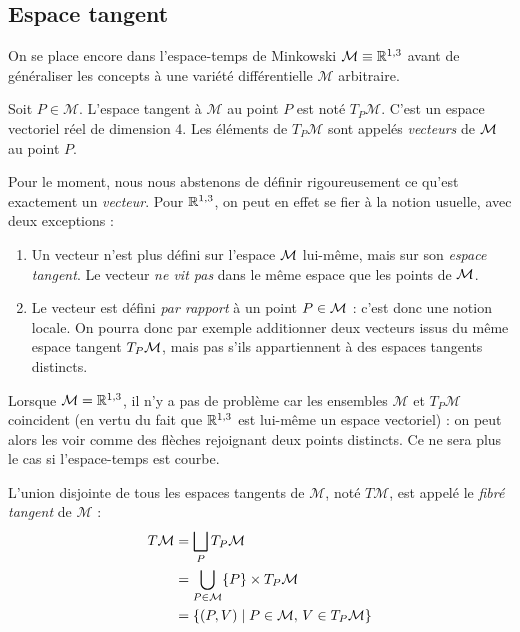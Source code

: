 {\subsection{Espace tangent}
On se place encore dans l'espace-temps de Minkowski $\mathcal{M} \equiv \mathbb{R}^{1,3}$ avant de généraliser les concepts à une variété différentielle $\mathcal{M}$ arbitraire.

\begin{theoremframe}
    \begin{notat}
        Soit $P\in \mathcal{M}$. L'espace tangent à $\mathcal{M}$ au point $P$ est noté $T_P\mathcal{M}$. C'est un espace vectoriel réel de dimension 4. Les éléments de $T_P\mathcal{M}$ sont appelés \textit{vecteurs} de $\mathcal{M}$ au point $P$. 
    \end{notat}
\end{theoremframe}
Pour le moment, nous nous abstenons de définir rigoureusement ce qu'est exactement un \emph{vecteur}. Pour $\mathbb{R}^{1,3}$, on peut en effet se fier à la notion usuelle, avec deux exceptions :
\begin{enumerate}[label=(\roman*).]
    \item Un vecteur n'est plus défini sur l'espace $\mathcal{M}$ lui-même, mais sur son \emph{espace tangent}. Le vecteur \textit{ne vit pas} dans le même espace que les points de $\mathcal{M}$.
    \item Le vecteur est défini \emph{par rapport} à un point $P\in \mathcal{M}$ : c'est donc une notion locale. On pourra donc par exemple additionner deux vecteurs issus du même espace tangent $T_P\mathcal{M}$, mais pas s'ils appartiennent à des espaces tangents distincts.
\end{enumerate}
Lorsque $\mathcal{M} = \mathbb{R}^{1,3}$, il n'y a pas de problème car les ensembles $\mathcal{M}$ et $T_P\mathcal{M}$ coincident (en vertu du fait que $\mathbb{R}^{1,3}$ est lui-même un espace vectoriel) : on peut alors les voir comme des flèches rejoignant deux points distincts. Ce ne sera plus le cas si l'espace-temps est courbe.
\begin{theoremframe}
    \begin{defi}
        L'union disjointe de tous les espaces tangents de $\mathcal{M}$, noté $T\mathcal{M}$, est appelé le \textit{fibré tangent} de $\mathcal{M}$ :
        \begin{align}
            \nonumber
            T\M &= \bigsqcup_P T_P\mathcal{M} \\
            & = \bigcup_{P \in \M} \{ P\} \times T_P \M \\
            \nonumber
            & = \{ (P,V) \mid P \in \M, \, V \in T_P\M\}

\end{align}
\end{defi}
\end{theoremframe}}
